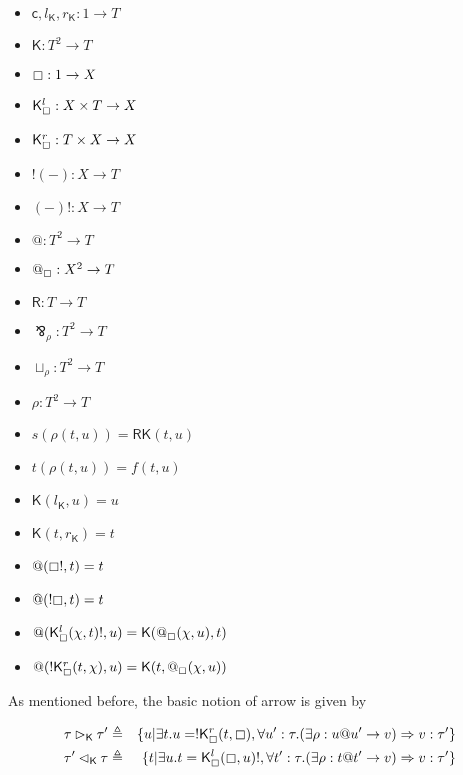 \documentclass{llncs}
\renewcommand{\:}{\colon}
\begin{document}
\begin{itemize}
  \item $\mathsf{c}, l_{\mathsf{K}}, r_{\mathsf{K}} : 1 \rightarrow T$
  \item $\mathsf{K} : T^{2} \rightarrow T$
  \item $\boxempty : 1 \rightarrow X$
  \item $\mathsf{K}_{\boxempty}^{l} : X \times T \rightarrow X$
  \item $\mathsf{K}_{\boxempty}^{r} : T \times X \rightarrow X$
  \item $!(-) : X  \rightarrow T$
  \item $(-)! : X  \rightarrow T$
  \item $@ : T^{2} \rightarrow T$
  \item $@_{\boxempty} : X^{2} \rightarrow T$
  \item $\mathsf{R} : T \rightarrow T$
  \item $\bindnasrepma_{\rho} : T^{2} \rightarrow T$
  \item $\sqcup_{\rho} : T^{2} \rightarrow T$
  \item $\rho : T^{2} \rightarrow T$             %
  \item $s(\rho(t,u)) = \mathsf{R}\mathsf{K}(t, u)$ 
  \item $t(\rho(t,u)) = f(t,u)$          %
  \item $\mathsf{K}(l_{\mathsf{K}}, u) = u$
  \item $\mathsf{K}(t, r_{\mathsf{K}}) = t$
  \item $@(\boxempty !,t) = t$
  \item $@(!\boxempty,t) = t$
  \item $@(\mathsf{K}_{\boxempty}^{l} (\chi, t)!, u) = \mathsf{K}(@_{\boxempty}(\chi, u), t)$
  \item  $@(!\mathsf{K}_{\boxempty}^{r} (t, \chi), u) = \mathsf{K}(t, @_{\boxempty}(\chi, u))$
\end{itemize}

As mentioned before, the basic notion of arrow is given by

\begin{eqnarray*}
  \tau \rhd_{\mathsf{K}} \tau' & \triangleq  & \{ u | \exists t. u = !\mathsf{K}_{\boxempty}^{r}(t, \boxempty),\forall u':\tau. (\exists \rho : u@u'\rightarrow v) \Rightarrow v:\tau' \} \\
  \tau'\lhd_{\mathsf{K}} \tau & \triangleq  & \{ t | \exists u. t = \mathsf{K}_{\boxempty}^{l}(\boxempty, u)!,\forall t':\tau. (\exists \rho : t@t'\rightarrow v) \Rightarrow v:\tau'\}
\end{eqnarray*}
\end{document}
